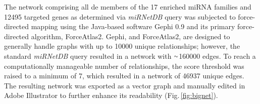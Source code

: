 \begin{method}

The network comprising all \ac{de} members of the 17 enriched miRNA families and \num{12495} targeted genes as determined via \textit{miRNetDB} query was subjected to force-directed mapping using the Java-based software Gephi 0.9 and its primary force-directed algorithm, ForceAtlas2.\cite{Jacomy2014} Gephi, and ForceAtlas2, are designed to generally handle graphs with up to \num{10000} unique relationships; however, the standard \textit{miRNetDB} query resulted in a network with $\smallsim$\num{160000} edges. To reach a computationally manageable number of relationships, the score threshold was raised to a minimum of 7, which resulted in a network of \num{46937} unique edges. The resulting network was exported as a vector graph and manually edited in Adobe Illustrator to further enhance its readability (Fig.\,\ref{fig:bignet}).

\end{method}

